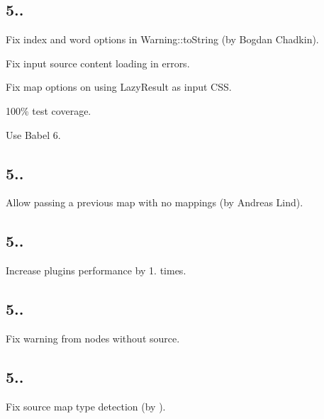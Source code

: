 \subsection*{5..}


\begin{DoxyItemize}
\item Fix {\ttfamily index} and {\ttfamily word} options in {\ttfamily Warning\+::to\+String} (by Bogdan Chadkin).
\item Fix input source content loading in errors.
\item Fix map options on using {\ttfamily Lazy\+Result} as input C\+SS.
\item 100\% test coverage.
\item Use Babel 6.
\end{DoxyItemize}

\subsection*{5..}


\begin{DoxyItemize}
\item Allow passing a previous map with no mappings (by Andreas Lind).
\end{DoxyItemize}

\subsection*{5..}


\begin{DoxyItemize}
\item Increase plugins performance by 1. times.
\end{DoxyItemize}

\subsection*{5..}


\begin{DoxyItemize}
\item Fix warning from nodes without source.
\end{DoxyItemize}

\subsection*{5..}


\begin{DoxyItemize}
\item Fix source map type detection (by ).
\end{DoxyItemize}

